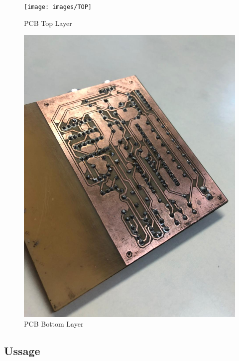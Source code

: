 \begin{figure}[H]
\begin{centering}
\texttt{[image: images/TOP]}
\par\end{centering}
\caption{PCB Top Layer}

\end{figure}

\begin{figure}[H]
\begin{centering}
\includegraphics[scale=0.2]{images/BOT}
\par\end{centering}
\caption{PCB Bottom Layer}

\end{figure}

\subsection{Ussage}

